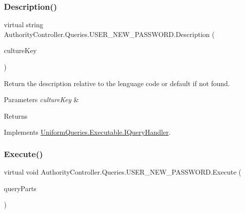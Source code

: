\subsubsection{\texorpdfstring{Description()}{Description()}}
{\footnotesize\ttfamily virtual string Authority\+Controller.\+Queries.\+U\+S\+E\+R\+\_\+\+N\+E\+W\+\_\+\+P\+A\+S\+S\+W\+O\+R\+D.\+Description (\begin{DoxyParamCaption}\item[{string}]{culture\+Key }\end{DoxyParamCaption})\hspace{0.3cm}{\ttfamily [virtual]}}



Return the description relative to the lenguage code or default if not found. 


\begin{DoxyParams}{Parameters}
{\em culture\+Key} & \\
\hline
\end{DoxyParams}
\begin{DoxyReturn}{Returns}

\end{DoxyReturn}


Implements \mbox{\hyperlink{interface_uniform_queries_1_1_executable_1_1_i_query_handler_ae0e55919571d5456af31298394d241a9}{Uniform\+Queries.\+Executable.\+I\+Query\+Handler}}.

\mbox{\label{class_authority_controller_1_1_queries_1_1_u_s_e_r___n_e_w___p_a_s_s_w_o_r_d_a567cb1f67a718cab9dae99a9d4e892d4}} 
\subsubsection{\texorpdfstring{Execute()}{Execute()}}
{\footnotesize\ttfamily virtual void Authority\+Controller.\+Queries.\+U\+S\+E\+R\+\_\+\+N\+E\+W\+\_\+\+P\+A\+S\+S\+W\+O\+R\+D.\+Execute (\begin{DoxyParamCaption}\item[{\mbox{\hyperlink{struct_uniform_queries_1_1_query_part}{Query\+Part}} \mbox{[}$\,$\mbox{]}}]{query\+Parts }\end{DoxyParamCaption})\hspace{0.3cm}{\ttfamily [virtual]}}



